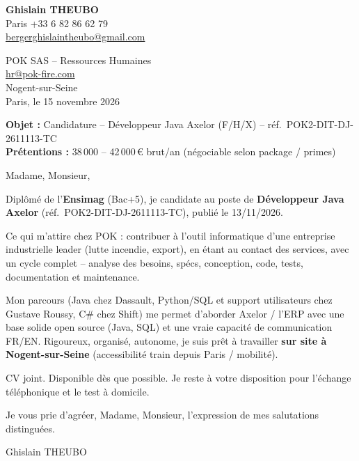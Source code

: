 \documentclass[11pt,a4paper]{article}
\begin{document}

\noindent\textbf{Ghislain THEUBO}\\
Paris \quad +33 6 82 86 62 79\\
\href{mailto:bergerghislaintheubo@gmail.com}{bergerghislaintheubo@gmail.com}

\vspace{0.45em}
\begin{flushright}
POK SAS -- Ressources Humaines\\
\href{mailto:hr@pok-fire.com}{hr@pok-fire.com}\\
Nogent-sur-Seine\\
Paris, le 15 novembre 2026
\end{flushright}

\vspace{0.3em}
\noindent\textbf{Objet :} Candidature -- D\'eveloppeur Java Axelor (F/H/X) -- r\'ef.\ POK2-DIT-DJ-2611113-TC\\
\noindent\textbf{Pr\'etentions :} 38\,000 -- 42\,000\,€ brut/an (n\'egociable selon package / primes)

\vspace{0.65em}
\noindent Madame, Monsieur,

\vspace{0.35em}
\noindent Dipl\^om\'e de l'\textbf{Ensimag} (Bac+5), je candidate au poste de \textbf{D\'eveloppeur Java Axelor} (r\'ef.\ POK2-DIT-DJ-2611113-TC), publi\'e le 13/11/2026.

\vspace{0.3em}
\noindent Ce qui m'attire chez POK : contribuer \`a l'outil informatique d'une entreprise industrielle leader (lutte incendie, export), en \'etant au contact des services, avec un cycle complet -- analyse des besoins, sp\'ecs, conception, code, tests, documentation et maintenance.

\vspace{0.25em}
\noindent Mon parcours (Java chez Dassault, Python/SQL et support utilisateurs chez Gustave Roussy, C\# chez Shift) me permet d'aborder Axelor / l'ERP avec une base solide open source (Java, SQL) et une vraie capacit\'e de communication FR/EN. Rigoureux, organis\'e, autonome, je suis pr\^et \`a travailler \textbf{sur site \`a Nogent-sur-Seine} (accessibilit\'e train depuis Paris / mobilit\'e).

\vspace{0.35em}
\noindent CV joint. Disponible d\`es que possible. Je reste \`a votre disposition pour l'\'echange t\'el\'ephonique et le test \`a domicile.

\vspace{0.5em}
\noindent Je vous prie d'agr\'eer, Madame, Monsieur, l'expression de mes salutations distingu\'ees.

\vspace{1em}
\noindent Ghislain THEUBO
\end{document}
